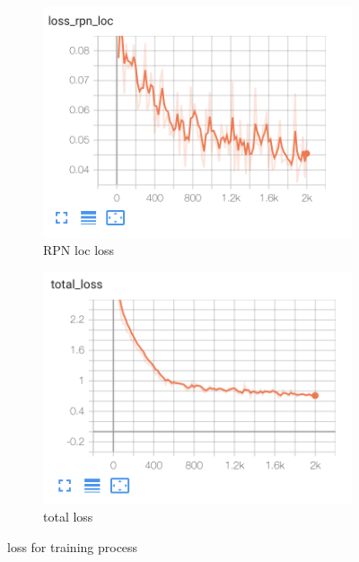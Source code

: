 \documentclass[conference]{IEEEtran}
\begin{document}
\begin{figure}[h!]
\begin{subfigure}[h!]{0.24\textwidth}
    \includegraphics[width=\textwidth]{img/loss_rpn_loc.png}
    \caption{RPN loc loss}
    \label{fig:loss_rpn_loc}
\end{subfigure}
\hfill
\begin{subfigure}[h!]{0.24\textwidth}
    \centering
    \includegraphics[width=\textwidth]{img/loss_total.png}
    \caption{total loss}
    \label{fig:loss_total}
\end{subfigure}
   \caption{loss for training process}
   \label{fig:loss for training process}
\end{figure}
\end{document}
